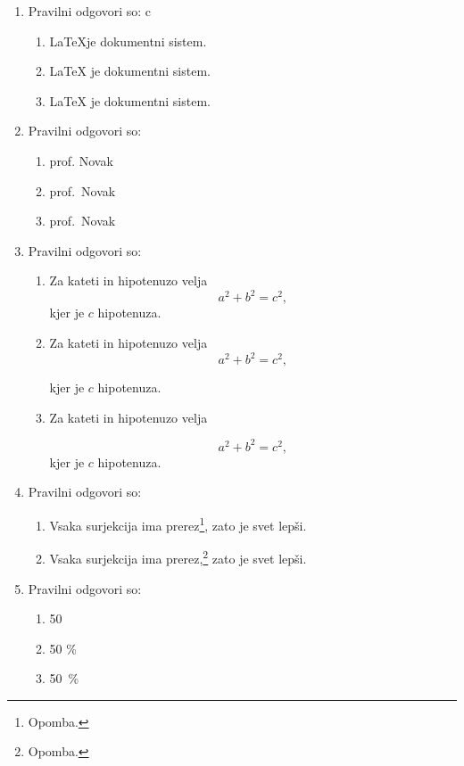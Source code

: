 \documentclass[11pt]{article}
\begin{document}
\begin{enumerate}
    \item Pravilni odgovori so: c%
    \begin{enumerate}
        \item \LaTeX je dokumentni sistem.
        \item {\LaTeX} je dokumentni sistem.
        \item \LaTeX{} je dokumentni sistem.
    \end{enumerate}

    \item Pravilni odgovori so: %
    \begin{enumerate}
        \item prof. Novak
        \item prof.~Novak
        \item prof.\ Novak
    \end{enumerate}

    \item Pravilni odgovori so: %
    \begin{enumerate}
        \item
Za kateti in hipotenuzo velja
\[
  a^2 + b^2 = c^2,
\]
kjer je \(c\) hipotenuza.
        \item
Za kateti in hipotenuzo velja
\[
  a^2 + b^2 = c^2,
\]

kjer je \(c\) hipotenuza.
        \item
Za kateti in hipotenuzo velja

\[
  a^2 + b^2 = c^2,
\]
kjer je \(c\) hipotenuza.
    \end{enumerate}

    \item Pravilni odgovori so: %
    \begin{enumerate}
        \item Vsaka surjekcija ima prerez\footnote{Opomba.}, zato je svet lepši.
        \item Vsaka surjekcija ima prerez,\footnote{Opomba.} zato je svet lepši.
    \end{enumerate}

    \item Pravilni odgovori so: %
    \begin{enumerate}
        \item 50 %
        \item 50 \%
        \item 50~\%
    \end{enumerate}


\end{enumerate}
\end{document}
